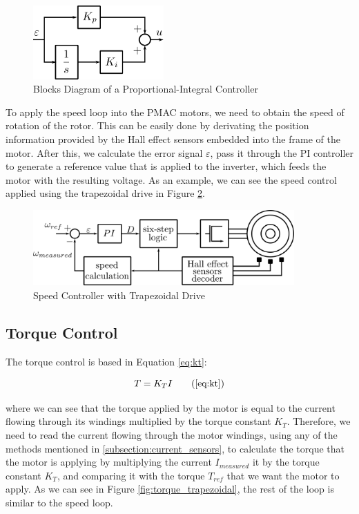 \begin{figure}[htbp]
\centering
\includegraphics[width=5cm]{Images/pi_controller.png} 
\caption[PI Controller]{Blocks Diagram of a Proportional-Integral Controller}
\label{fig:pi_controller}
\end{figure}

To apply the speed loop into the \ac{PMAC} motors, we need to obtain the speed of rotation of the rotor. This can be easily done by derivating the position information provided by the Hall effect sensors embedded into the frame of the motor. After this, we calculate the error signal $\varepsilon$, pass it through the \ac{PI} controller to generate a reference value that is applied to the inverter, which feeds the motor with the resulting voltage. As an example, we can see the speed control applied using the trapezoidal drive in Figure \ref{fig:speed_trapezoidal}.

\begin{figure}[htbp]
\centering
\includegraphics[width=10cm]{Images/speed_trapezoidal.png} 
\caption[Speed Controller with Trapezoidal Drive]{Speed Controller with Trapezoidal Drive}
\label{fig:speed_trapezoidal}
\end{figure}

\subsection{Torque Control}

The torque control is based in Equation \ref{eq:kt}:

\begin{equation}
T=K_{T}I \tag{\ref{eq:kt}}
\end{equation}

where we can see that the torque applied by the motor is equal to the current flowing through its windings multiplied by the torque constant $K_{T}$. Therefore, we need to read the current flowing through the motor windings, using any of the methods mentioned in \ref{subsection:current_sensors}, to calculate the torque that the motor is applying by multiplying the current $I_{measured}$ it by the torque constant $K_{T}$, and comparing it with the torque $T_{ref}$ that we want the motor to apply. As we can see in Figure \ref{fig:torque_trapezoidal}, the rest of the loop is similar to the speed loop.

